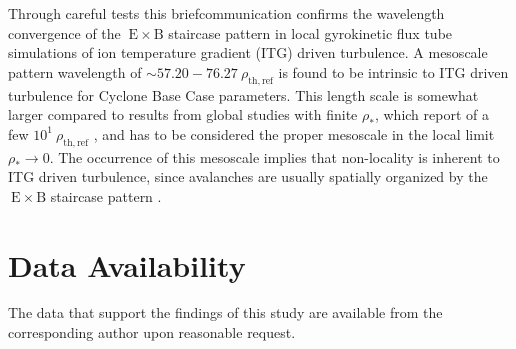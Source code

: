 \documentclass[aip, amsmath, amssymb, reprint, twocolumn]{revtex4-1}
\newcommand{\exb}{\mathrm{\:E \times B}}
\newcommand{\rhothref}{\rho_\mathrm{th,ref}}
\begin{document}

\bigskip
\bigskip
\bigskip
\bigskip
\bigskip
\bigskip

Through careful tests this briefcommunication confirms the wavelength convergence of the $\exb$ staircase pattern in local gyrokinetic flux tube simulations of ion temperature gradient (ITG) driven turbulence.
A mesoscale pattern wavelength of $\sim 57.20 - 76.27~\rhothref$ is found to be intrinsic to ITG driven turbulence for Cyclone Base Case parameters.
This length scale is somewhat larger compared to results from global studies with finite $\rho_\ast$, which report of a few $10^1~\rhothref$ \cite{pradalier2010}, and has to be considered the proper mesoscale in the local limit $\rho_\ast \rightarrow 0$.  
The occurrence of this mesoscale implies that non-locality is inherent to ITG driven turbulence, since avalanches are usually spatially organized by the $\exb$ staircase pattern \cite{mcmillan2009, pradalier2010, rath2016, peeters2016}. 



\section*{Data Availability}
The data that support the findings of this study are available from the corresponding author upon reasonable request. 
\bigskip
\bigskip
\bigskip
\bigskip
\bigskip
\bigskip


\wordcountmessage


\nocite{}
\end{document}

